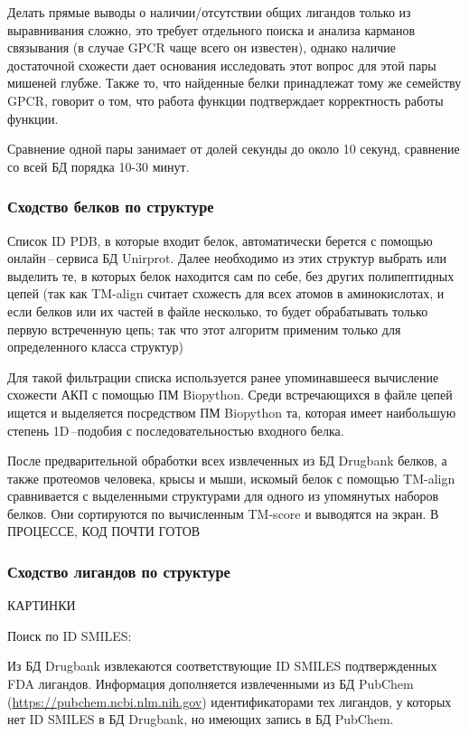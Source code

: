 \documentclass[a4paper,14pt]{article}         %
\begin{document}
Делать прямые выводы о наличии/отсутствии общих лигандов только из выравнивания сложно, это требует отдельного поиска и анализа карманов связывания (в случае GPCR чаще всего он известен), однако наличие достаточной схожести дает основания исследовать этот вопрос для этой пары мишеней глубже. Также то, что найденные белки принадлежат тому же семейству GPCR, говорит о том, что работа функции подтверждает корректность работы функции.

Сравнение одной пары занимает от долей секунды до около 10 секунд, сравнение со всей БД порядка 10-30 минут.
\subsubsection{Сходство белков по структуре}
Список ID PDB, в которые входит белок, автоматически берется с помощью онлайн\,--\,сервиса БД Unirprot. Далее необходимо из этих структур выбрать или выделить те, в которых белок находится сам по себе, без других полипептидных цепей (так как TM-align считает схожесть для всех атомов в аминокислотах, и если белков или их частей в файле несколько, то будет обрабатывать только первую встреченную цепь; так что этот алгоритм применим только для определенного класса структур)

Для такой фильтрации списка используется ранее упоминавшееся вычисление схожести АКП с помощью ПМ Biopython. Среди встречающихся в файле цепей ищется и выделяется посредством ПМ Biopython та, которая имеет наибольшую степень 1D\,--подобия с последовательностью входного белка.

После предварительной обработки всех извлеченных из БД Drugbank белков, а также протеомов человека, крысы и мыши, искомый белок с помощью TM-align сравнивается с выделенными структурами для одного из упомянутых наборов белков. Они сортируются по вычисленным TM-score и выводятся на экран.
\color{orange} В ПРОЦЕССЕ, КОД ПОЧТИ ГОТОВ
\color{black}
\subsubsection{Сходство лигандов по структуре}
\color{orange} КАРТИНКИ
\color{black}

Поиск по ID SMILES:

Из БД Drugbank извлекаются соответствующие ID SMILES подтвержденных FDA лигандов. Информация дополняется извлеченными из БД PubChem (\href{https://pubchem.ncbi.nlm.nih.gov}{https://pubchem.ncbi.nlm.nih.gov}) идентификаторами тех лигандов, у которых нет ID SMILES в БД Drugbank, но имеющих запись в БД PubChem.
\end{document}
